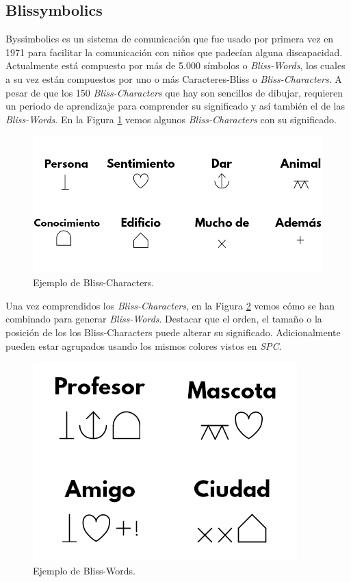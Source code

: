 \subsection{Blissymbolics}
\label{cap3:sec:Blissymbolics}
Byssimbolics \citep{blissymbolics}
es un sistema de comunicación que fue usado por primera vez en 1971 para facilitar la comunicación con niños que padecían alguna discapacidad. Actualmente está compuesto por más de 5.000 símbolos o  \textit{Bliss-Words}, los cuales a su vez están compuestos por uno o más Caracteres-Bliss o  \textit{Bliss-Characters}. A pesar de que los 150 \textit{Bliss-Characters} que hay son sencillos de dibujar, requieren un periodo de aprendizaje para comprender su significado y así también el de las \textit{Bliss-Words}. En la Figura \ref{fig:blisscharacters} vemos algunos \textit{Bliss-Characters} con su significado.

\begin{figure}[h!]
	\centering
	\includegraphics[width=0.8\linewidth]{Imagenes/Bitmap/BlissCharacters}
	\caption[Ejemplo de Bliss-Characters]{Ejemplo de Bliss-Characters.}
	\label{fig:blisscharacters}
\end{figure}
Una vez comprendidos los \textit{Bliss-Characters}, en la Figura \ref{fig:blissword} vemos cómo se han combinado para generar \textit{Bliss-Words}. Destacar que el orden, el tamaño o la posición de los los Bliss-Characters puede alterar su significado. Adicionalmente pueden estar agrupados usando los mismos colores vistos en \textit{SPC}.

\begin{figure}[h!]
	\centering
	\includegraphics[width=0.4\linewidth]{Imagenes/Bitmap/BlissWord}
	\caption[Ejemplo de Bliss-Words]{Ejemplo de Bliss-Words.}
	\label{fig:blissword}
\end{figure}



